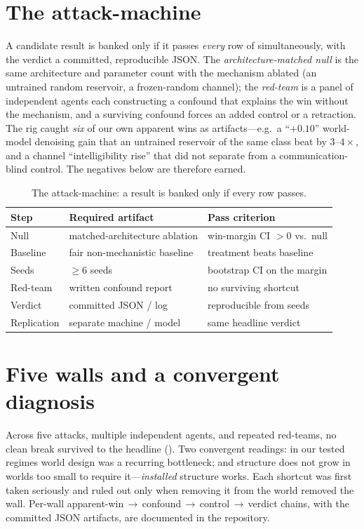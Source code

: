 \documentclass[letterpaper]{article}
\begin{document}
\section{The attack-machine}
A candidate result is banked only if it passes \emph{every} row of
 simultaneously, with the verdict a committed, reproducible
JSON. The \emph{architecture-matched null} is the same architecture and parameter
count with the mechanism ablated (an untrained random reservoir, a frozen-random
channel); the \emph{red-team} is a panel of independent agents each constructing a
confound that explains the win without the mechanism, and a surviving confound
forces an added control or a retraction. The rig caught
\emph{six} of our own apparent wins as artifacts---e.g.\ a ``$+0.10$'' world-model
denoising gain that an untrained reservoir of the same class beat by $3$--$4\times$,
and a channel ``intelligibility rise'' that did not separate from a
communication-blind control. The negatives below are therefore earned.

\begin{table}[ht]
\footnotesize
\centering
\caption{The attack-machine: a result is banked only if every row passes.}
\label{tab:protocol}
\begin{tabular}{@{}lll@{}}
\toprule
Step & Required artifact & Pass criterion \\
\midrule
Null & matched-architecture ablation & win-margin CI $>0$ vs.\ null \\
Baseline & fair non-mechanistic baseline & treatment beats baseline \\
Seeds & $\geq$6 seeds & bootstrap CI on the margin \\
Red-team & written confound report & no surviving shortcut \\
Verdict & committed JSON / log & reproducible from seeds \\
Replication & separate machine / model & same headline verdict \\
\bottomrule
\end{tabular}
\end{table}

\section{Five walls and a convergent diagnosis}
Across five attacks, multiple independent agents, and repeated red-teams, no
clean break survived to the headline (). Two convergent readings:
in our tested regimes world design was a recurring bottleneck; and structure does
not grow in worlds too small to require it---\emph{installed} structure works. Each shortcut was first taken seriously and
ruled out only when removing it from the world removed the wall. Per-wall
apparent-win\,$\to$\,confound\,$\to$\,control\,$\to$\,verdict chains, with the
committed JSON artifacts, are documented in the repository.
\end{document}
